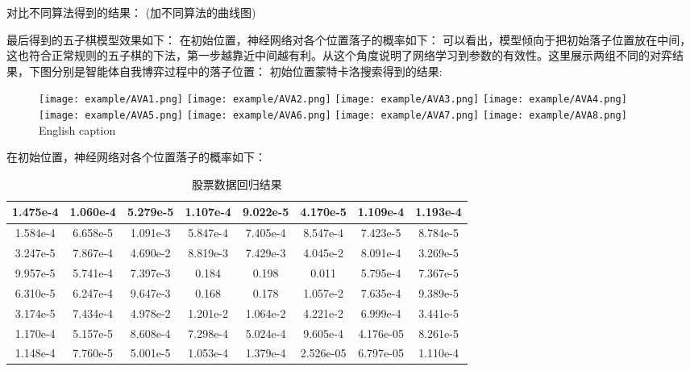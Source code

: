 对比不同算法得到的结果：
(加不同算法的曲线图)

最后得到的五子棋模型效果如下：
在初始位置，神经网络对各个位置落子的概率如下：
可以看出，模型倾向于把初始落子位置放在中间，这也符合正常规则的五子棋的下法，第一步越靠近中间越有利。从这个角度说明了网络学习到参数的有效性。这里展示两组不同的对弈结果，下图分别是智能体自我博弈过程中的落子位置：
初始位置蒙特卡洛搜索得到的结果:

\begin{figure}[!htpb]
	\centering
	\texttt{[image: example/AVA1.png]}
	\hspace{0.5cm}
	\texttt{[image: example/AVA2.png]}
	\hspace{0.5cm}
	\texttt{[image: example/AVA3.png]}
	\hspace{0.5cm}
	\texttt{[image: example/AVA4.png]}
	\hspace{0.5cm}
	\texttt{[image: example/AVA5.png]}
	\hspace{0.5cm}
	\texttt{[image: example/AVA6.png]}
	\hspace{0.5cm}
	\texttt{[image: example/AVA7.png]}
	\hspace{0.5cm}
	\texttt{[image: example/AVA8.png]}
	{English caption}
	\label{fig:AIvsAI}
\end{figure}

在初始位置，神经网络对各个位置落子的概率如下：
\begin{table}[t]
	\centering
	\caption{股票数据回归结果}
\begin{tabular}{|c|c|c|c|c|c|c|c|}
	\hline 
	1.475e-4 & 1.060e-4 & 5.279e-5 & 1.107e-4 & 9.022e-5 & 4.170e-5 & 1.109e-4 & 1.193e-4 \\ 
	\hline 
	1.584e-4 & 6.658e-5 & 1.091e-3 & 5.847e-4 & 7.405e-4 & 8.547e-4 & 7.423e-5 & 8.784e-5 \\ 
	\hline 
	3.247e-5 & 7.867e-4& 4.690e-2 & 8.819e-3 & 7.429e-3&4.045e-2 & 8.091e-4 & 3.269e-5 \\ 
	\hline 
	9.957e-5& 5.741e-4 & 7.397e-3 & 0.184 & 0.198 & 0.011& 5.795e-4 & 7.367e-5 \\ 
	\hline 
	6.310e-5 &6.247e-4& 9.647e-3& 0.168 & 0.178 & 1.057e-2 & 7.635e-4 & 9.389e-5 \\ 
	\hline 
	3.174e-5 & 7.434e-4 & 4.978e-2 & 1.201e-2 & 1.064e-2 & 4.221e-2 & 6.999e-4 & 3.441e-5 \\ 
	\hline 
	1.170e-4 & 5.157e-5& 8.608e-4 & 7.298e-4 & 5.024e-4 & 9.605e-4 & 4.176e-05 & 8.261e-5\\ 
	\hline 
	1.148e-4 &7.760e-5 &  5.001e-5 & 1.053e-4 & 1.379e-4 & 2.526e-05 & 6.797e-05 & 1.110e-4 \\ 
	\hline 
\end{tabular} 
\end{table}

